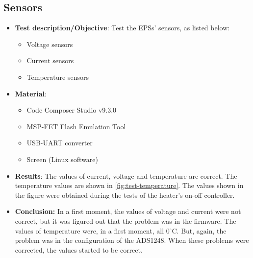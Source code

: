 \subsection{Sensors}

\begin{itemize}
    \item \textbf{Test description/Objective}: Test the EPSs' sensors, as listed below:
        \begin{itemize}
            \item Voltage sensors
            \item Current sensors
            \item Temperature sensors
        \end{itemize}
    \item \textbf{Material}:
        \begin{itemize}
            \item Code Composer Studio v9.3.0
            \item MSP-FET Flash Emulation Tool
            \item USB-UART converter
            \item Screen (Linux software)
        \end{itemize}
    \item \textbf{Results}: The values of current, voltage and temperature are correct. The temperature values are shown in \autoref{fig:test-temperature}. The values shown in the figure were obtained during the tests of the heater's on-off controller.
    \item \textbf{Conclusion:} In a first moment, the values of voltage and current were not correct, but it was figured out that the problem was in the firmware. The values of temperature were, in a first moment, all 0$^{\circ}$C. But, again, the problem was in the configuration of the ADS1248. When these problems were corrected, the values started to be correct.
\end{itemize}

\newpage

